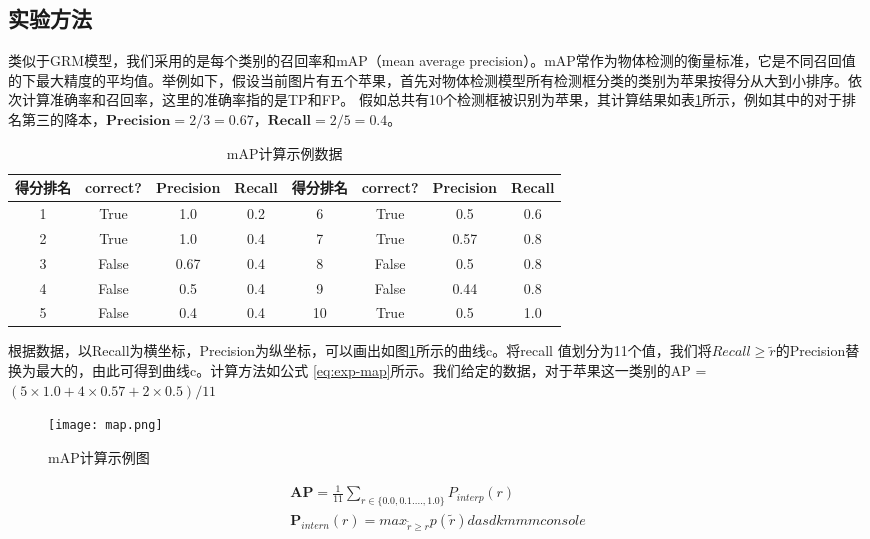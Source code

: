 \subsection{实验方法}
类似于GRM模型，我们采用的是每个类别的召回率和mAP（mean average precision）。mAP常作为物体检测的衡量标准，它是不同召回值的下最大精度的平均值。举例如下，假设当前图片有五个苹果，首先对物体检测模型所有检测框分类的类别为苹果按得分从大到小排序。依次计算准确率和召回率，这里的准确率指的是TP和FP。 假如总共有10个检测框被识别为苹果，其计算结果如表\ref{tab:exp-map}所示，例如其中的对于排名第三的降本，$\textbf{Precision} = 2/3 = 0.67$，$\textbf{Recall} = 2/5 = 0.4$。
\begin{table}[htpb]
  \centering
  \caption{mAP计算示例数据}
  \label{tab:exp-map}
  \begin{tabular}{c|c|c|c|c|c|c|c}
    \toprule
    \textbf{得分排名} & \textbf{correct?} & \textbf{Precision} & \textbf{Recall}  & \textbf{得分排名} & \textbf{correct?} & \textbf{Precision} & \textbf{Recall}   \\
    \midrule
    1 & True & 1.0 & 0.2  & 6 & True & 0.5 & 0.6    \\
    \midrule
    2 &  True & 1.0 & 0.4  & 7 & True & 0.57 & 0.8  \\
    \midrule
    3 & False & 0.67 & 0.4  & 8 & False & 0.5 & 0.8  \\
    \midrule
    4 & False & 0.5 & 0.4   & 9 & False & 0.44 & 0.8 \\
    \midrule
    5 & False & 0.4 & 0.4  & 10 & True & 0.5 & 1.0 \\
    \bottomrule
  \end{tabular}
\end{table}
根据数据，以Recall为横坐标，Precision为纵坐标，可以画出如图\ref{fig:exp-map}所示的曲线c。将recall 值划分为11个值，我们将$Recall \geq \widetilde{r}$的Precision替换为最大的，由此可得到曲线c。计算方法如公式
\ref{eq:exp-map}所示。我们给定的数据，对于苹果这一类别的AP = $(5 \times 1.0 + 4 \times 0.57 + 2 \times 0.5)/11$
\begin{figure}[htpb]
	\centering
	\texttt{[image: map.png]}
    \caption{mAP计算示例图}
	\vspace*{-3.5mm}
	\label{fig:exp-map}
\end{figure}
\begin{equation} \label{eq:exp-map}
\begin{split}
    \mathbf{AP} = \frac{1}{11}\sum_{r \in \{0.0,0.1....,1.0\}}P_{interp}(r) \\
    \mathbf{P}_{intern}(r) = max_{\widetilde{r} \geq r}p(\widetilde{r}) dasdkmmm console
\end{split}
\end{equation}

